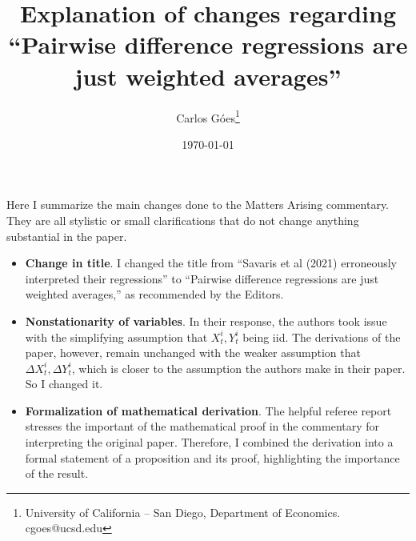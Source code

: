 \documentclass{article}
\title{Explanation of changes regarding ``Pairwise difference regressions are just weighted averages''}
\author{Carlos Góes\footnote{University of California -- San Diego, Department of Economics. cgoes@ucsd.edu}}
\date{\today}
\theoremstyle{lemma}
\begin{document}
\maketitle

Here I summarize the main changes done to the Matters Arising commentary. They are all stylistic or small clarifications that do not change anything substantial in the paper.

\begin{itemize}
    \item \textbf{Change in title}. I changed the title from ``Savaris et al (2021) erroneously interpreted their regressions'' to ``Pairwise difference regressions are just weighted averages,'' as recommended by the Editors.
    \item \textbf{Nonstationarity of variables}. In their response, the authors took issue with the simplifying assumption that $X^i_t, Y_t^i$ being iid. The derivations of the paper, however, remain unchanged with the weaker assumption that $\Delta X^i_t, \Delta Y_t^i$, which is closer to the assumption the authors make in their paper. So I changed it.
    \item \textbf{Formalization of mathematical derivation}. The helpful referee report stresses the important of the mathematical proof in the commentary for interpreting the original paper. Therefore, I combined the derivation into a formal statement of a proposition and its proof, highlighting the importance of the result.
\end{itemize}
\end{document}
